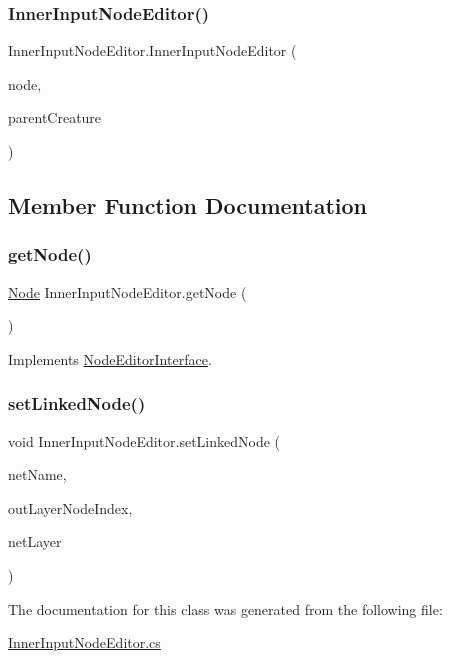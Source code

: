 \subsubsection{\texorpdfstring{Inner\+Input\+Node\+Editor()}{InnerInputNodeEditor()}}
{\footnotesize\ttfamily Inner\+Input\+Node\+Editor.\+Inner\+Input\+Node\+Editor (\begin{DoxyParamCaption}\item[{\mbox{\hyperlink{class_inner_input_node}{Inner\+Input\+Node}}}]{node,  }\item[{\mbox{\hyperlink{class_creature}{Creature}}}]{parent\+Creature }\end{DoxyParamCaption})}



\subsection{Member Function Documentation}
\mbox{\label{class_inner_input_node_editor_a211d3bfaad897b853671c9c61366779f}} 
\subsubsection{\texorpdfstring{get\+Node()}{getNode()}}
{\footnotesize\ttfamily \mbox{\hyperlink{class_node}{Node}} Inner\+Input\+Node\+Editor.\+get\+Node (\begin{DoxyParamCaption}{ }\end{DoxyParamCaption})}



Implements \mbox{\hyperlink{interface_node_editor_interface_a56e2abaedf17d7fbf2be90d521ec9363}{Node\+Editor\+Interface}}.

\mbox{\label{class_inner_input_node_editor_ac3ad2c6210d5a95549d598b29e24caf0}} 
\subsubsection{\texorpdfstring{set\+Linked\+Node()}{setLinkedNode()}}
{\footnotesize\ttfamily void Inner\+Input\+Node\+Editor.\+set\+Linked\+Node (\begin{DoxyParamCaption}\item[{string}]{net\+Name,  }\item[{int}]{out\+Layer\+Node\+Index,  }\item[{int}]{net\+Layer }\end{DoxyParamCaption})}



The documentation for this class was generated from the following file\+:\begin{DoxyCompactItemize}
\item 
\mbox{\hyperlink{_inner_input_node_editor_8cs}{Inner\+Input\+Node\+Editor.\+cs}}\end{DoxyCompactItemize}
